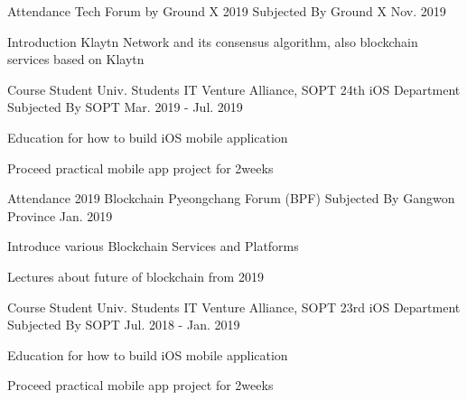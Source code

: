 \begin{cventries}
  \cventry
    {Attendance} %
    {Tech Forum by Ground X 2019} %
    {Subjected By Ground X} %
    {Nov. 2019} %
    {
      \begin{cvitems} %
        \item {Introduction Klaytn Network and its consensus algorithm, also blockchain services based on Klaytn}
      \end{cvitems}
    }

  \cventry
    {Course Student} %
    {Univ. Students IT Venture Alliance, SOPT 24th iOS Department} %
    {Subjected By SOPT} %
    {Mar. 2019 - Jul. 2019} %
    {
      \begin{cvitems} %
        \item {Education for how to build iOS mobile application}
        \item {Proceed practical mobile app project for 2weeks}
      \end{cvitems}
    }
    
  \cventry
    {Attendance} %
    {2019 Blockchain Pyeongchang Forum (BPF)} %
    {Subjected By Gangwon Province} %
    {Jan. 2019} %
    {
      \begin{cvitems} %
        \item {Introduce various Blockchain Services and Platforms}
        \item {Lectures about future of blockchain from 2019}
      \end{cvitems}
    }
    
  \cventry
    {Course Student} %
    {Univ. Students IT Venture Alliance, SOPT 23rd iOS Department} %
    {Subjected By SOPT} %
    {Jul. 2018 - Jan. 2019} %
    {
      \begin{cvitems} %
        \item {Education for how to build iOS mobile application}
        \item {Proceed practical mobile app project for 2weeks}
      \end{cvitems}
    }
    
\end{cventries}
